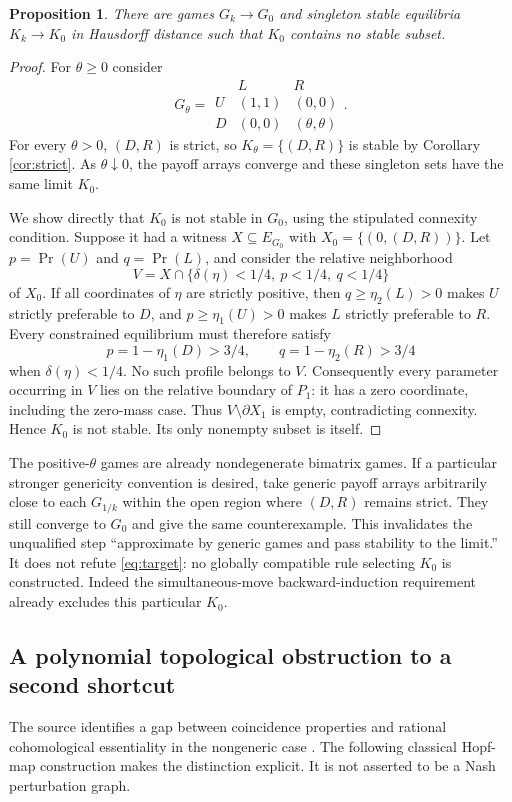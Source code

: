 \documentclass[11pt]{article}
\newtheorem{proposition}[theorem]{Proposition}
\theoremstyle{definition}
\begin{document}
\begin{proposition}\label{prop:limit}
There are games $G_k\to G_0$ and singleton stable equilibria $K_k\to K_0$
in Hausdorff distance such that $K_0$ contains no stable subset.
\end{proposition}
\begin{proof}
For $\theta\ge0$ consider
\[
 G_\theta=\begin{array}{c|cc}
      &L&R\\ \hline
 U&(1,1)&(0,0)\\
 D&(0,0)&(\theta,\theta)
 \end{array}.
\]
For every $\theta>0$, $(D,R)$ is strict, so $K_\theta=\{(D,R)\}$ is stable
by Corollary \ref{cor:strict}. As $\theta\downarrow0$, the payoff arrays
converge and these singleton sets have the same limit $K_0$.

We show directly that $K_0$ is not stable in $G_0$, using the stipulated
connexity condition. Suppose it had a witness $X\subseteq E_{G_0}$ with
$X_0=\{(0,(D,R))\}$. Let $p=\Pr(U)$ and $q=\Pr(L)$, and consider the
relative neighborhood
\[
 V=X\cap\{\delta(\eta)<1/4,\ p<1/4,\ q<1/4\}
\]
of $X_0$. If all coordinates of $\eta$ are strictly positive, then
$q\ge\eta_2(L)>0$ makes $U$ strictly preferable to $D$, and
$p\ge\eta_1(U)>0$ makes $L$ strictly preferable to $R$.
Every constrained equilibrium must therefore satisfy
\[
 p=1-\eta_1(D)>3/4,\qquad q=1-\eta_2(R)>3/4
\]
when $\delta(\eta)<1/4$. No such profile belongs to $V$.
Consequently every parameter occurring in $V$ lies on the relative boundary
of $P_1$: it has a zero coordinate, including the zero-mass case.
Thus $V\setminus\partial X_1$ is empty, contradicting connexity.
Hence $K_0$ is not stable. Its only nonempty subset is itself.
\end{proof}

The positive-$\theta$ games are already nondegenerate bimatrix games.
If a particular stronger genericity convention is desired, take generic
payoff arrays arbitrarily close to each $G_{1/k}$ within the open region
where $(D,R)$ remains strict. They still converge to $G_0$ and give the same
counterexample. This invalidates the unqualified step ``approximate by
generic games and pass stability to the limit.'' It does not refute
\eqref{eq:target}: no globally compatible rule selecting $K_0$ is constructed.
Indeed the simultaneous-move backward-induction requirement already excludes
this particular $K_0$.

\subsection{A polynomial topological obstruction to a second shortcut}\label{sec:hopf}
The source identifies a gap between coincidence properties and rational
cohomological essentiality in the nongeneric case \cite[Section 10]{gw}.
The following classical Hopf-map construction makes the distinction explicit.
It is not asserted to be a Nash perturbation graph.
\end{document}
